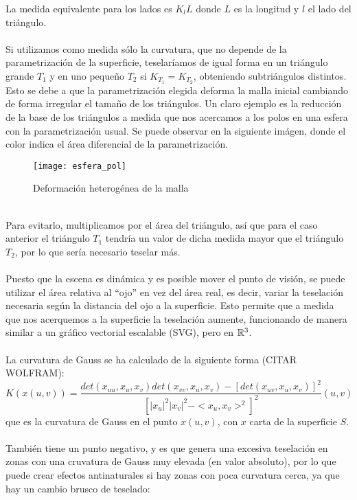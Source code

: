 	La medida equivalente para los lados es $K_l L$ donde $L$ es la longitud y $l$ el lado del triángulo.\\
	\\Si utilizamos como medida sólo la curvatura, que no depende de la parametrización de la superficie, teselaríamos de igual forma en un triángulo grande $T_1$ y en uno pequeño $T_2$ si $K_{T_1}=K_{T_2}$, obteniendo subtriángulos distintos. Esto se debe a que la parametrización elegida deforma la malla inicial cambiando de forma irregular el tamaño de los triángulos. Un claro ejemplo es la reducción de la base de los triángulos a medida que nos acercamos a los polos en una esfera con la parametrización usual. Se puede observar en la siguiente imágen, donde el color indica el área diferencial de la parametrización.\\
	\begin{figure}[h]
  		\centering
  		\texttt{[image: esfera\_pol]}
  		\caption{Deformación heterogénea de la malla}
  		\label{fig:esfera_pol}
	\end{figure}
	\\Para evitarlo, multiplicamos por el área del triángulo, así que para el caso anterior el triángulo $T_1$ tendría un valor de dicha medida mayor que el triángulo $T_2$, por lo que sería necesario teselar más.\\
	\\Puesto que la escena es dinámica y es posible mover el punto de visión, se puede utilizar el área relativa al ``ojo'' en vez del área real, es decir, variar la teselación necesaria según la distancia del ojo a la superficie. Esto permite que a medida que nos acerquemos a la superficie la teselación aumente, funcionando de manera similar a un gráfico vectorial escalable (SVG), pero en $\mathbb{R}^3$.\\
	\\La curvatura de Gauss se ha calculado de la siguiente forma (CITAR WOLFRAM):
		$$K(x(u,v)) = \frac{det(x_{uu}, x_u, x_v) det(x_{vv}, x_u, x_v) - [det(x_{uv}, x_u, x_v)]^2} {[|x_u|^2|x_v|^2 - <x_u, x_v>^2]^2} (u, v)$$
	que es la curvatura de Gauss en el punto $x(u, v)$, con $x$ carta de la superficie $S$.\\
	\\También tiene un punto negativo, y es que genera una excesiva teselación en zonas con una cruvatura de Gauss muy elevada (en valor absoluto), por lo que puede crear efectos antinaturales si hay zonas con poca curvatura cerca, ya que hay un cambio brusco de teselado:\\
